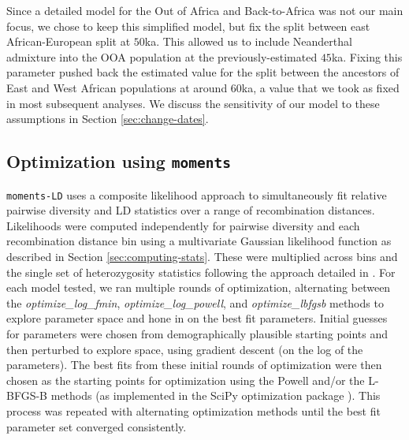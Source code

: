 \documentclass[]{article}
\newcommand{\sgcomment}[1]{{\textcolor{red}{SG: #1}}}
\newcommand{\moments}{\texttt{moments}\xspace}
\begin{document}
Since a detailed model for the Out of Africa and Back-to-Africa was not our
main focus, we chose to keep this simplified model, but fix the split between
east African-European split at $50$ka. This allowed us to include Neanderthal
admixture into the OOA population at the previously-estimated $45$ka. Fixing
this parameter pushed back the estimated value for the split between the
ancestors of East and West African populations at around $60$ka, a value that
we took as fixed in most subsequent analyses. 
We discuss the sensitivity of our model to these assumptions in Section
\ref{sec:change-dates}.

%
%

\subsection{Optimization using \moments}
\label{sec:optimization}

\texttt{moments-LD} uses a composite likelihood approach to simultaneously fit relative
pairwise diversity and LD statistics over a range of recombination distances.
Likelihoods were computed independently for pairwise diversity and each
recombination distance bin using a multivariate Gaussian likelihood function as
described in Section \ref{sec:computing-stats}. These were multiplied across
bins and the single set of heterozygosity statistics following the approach
detailed in \citet{Ragsdale2019-nt}. For each model tested, we ran multiple
rounds of optimization, alternating between the \emph{optimize\_log\_fmin},
\emph{optimize\_log\_powell}, and \emph{optimize\_lbfgsb} methods to explore
parameter space and hone in on the best fit parameters. Initial guesses for
parameters were chosen from demographically plausible starting points and then
perturbed to explore space, using gradient descent (on the log of the
parameters). The best fits from these initial rounds of optimization were then
chosen as the starting points for optimization using the Powell and/or the
L-BFGS-B methods (as implemented in the SciPy optimization package
\citep{Virtanen2020-kr}). This process was repeated with alternating
optimization methods until the best fit parameter set converged consistently.
\end{document}
